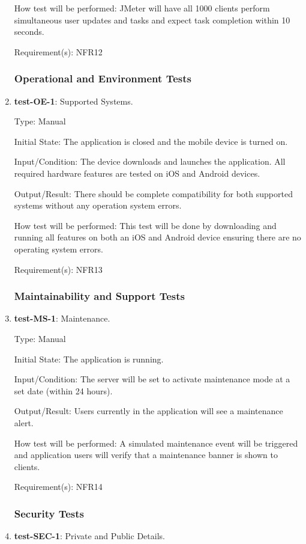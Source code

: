 \documentclass[12pt, titlepage]{article}
\begin{document}
\begin{enumerate}
		How test will be performed: JMeter will have all 1000 clients perform simultaneous user updates and tasks and expect task completion within 10 seconds.
		
		Requirement(s): NFR12
	\subsubsection{Operational and Environment Tests}
		\item{\textbf{test-OE-1}}: Supported Systems.
		
		Type: Manual
		
		Initial State: The application is closed and the mobile device is turned on.
		
		Input/Condition: The device downloads and launches the application. All required hardware features are tested on iOS and Android devices.
		
		Output/Result: There should be complete compatibility for both supported systems without any operation system errors. 
		
		How test will be performed: This test will be done by downloading and running all features on both an iOS and Android device ensuring there are no operating system errors.
		
		Requirement(s): NFR13
	\subsubsection{Maintainability and Support Tests}
		\item{\textbf{test-MS-1}}: Maintenance.
		
		Type: Manual
		
		Initial State: The application is running. 
		
		Input/Condition: The server will be set to activate maintenance mode at a set date (within 24 hours).
		
		Output/Result: Users currently in the application will see a maintenance alert.
		
		How test will be performed: A simulated maintenance event will be triggered and application users will verify that a maintenance banner is shown to clients.
		
		Requirement(s): NFR14
	\subsubsection{Security Tests}
		\item{\textbf{test-SEC-1}}: Private and Public Details.
		

\end{enumerate}
\end{document}
